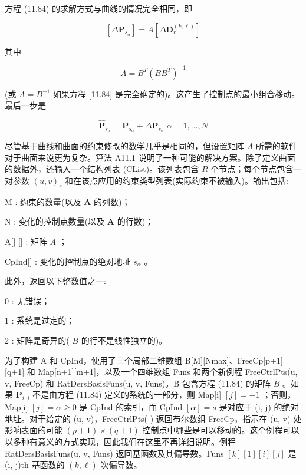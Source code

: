 \documentclass[../main.tex]{subfiles}
\begin{document}
方程 (11.84) 的求解方式与曲线的情况完全相同，即

\[
\left\lbrack  {\Delta {\mathbf{P}}_{{s}_{\alpha }}}\right\rbrack   = A\left\lbrack  {\Delta {\mathbf{D}}_{r}^{\left( k,\ell \right) }}\right\rbrack   \tag{11.85}
\]

其中

\[
A = {B}^{T}{\left( B{B}^{T}\right) }^{-1} \tag{11.86}
\]

(或 \(A = {B}^{-1}\) 如果方程 [11.84] 是完全确定的)。这产生了控制点的最小组合移动。最后一步是

\[
{\widehat{\mathbf{P}}}_{{s}_{\alpha }} = {\mathbf{P}}_{{s}_{\alpha }} + \Delta {\mathbf{P}}_{{s}_{\alpha }}\;\alpha  = 1,\ldots ,N \tag{11.87}
\]

尽管基于曲线和曲面的约束修改的数学几乎是相同的，但设置矩阵 \(A\) 所需的软件对于曲面来说更为复杂。算法 A11.1 说明了一种可能的解决方案。除了定义曲面的数据外，还输入一个结构列表 (CList)。该列表包含 \(R\) 个节点；每个节点包含一对参数 \({\left( u,v\right) }_{r}\) 和在该点应用的约束类型列表(实际约束不被输入)。输出包括:

M : 约束的数量(以及 \(\mathbf{A}\) 的列数)；

N : 变化的控制点数量(以及 \(\mathbf{A}\) 的行数)；

A[] [] : 矩阵 \(A\) ；

CpInd[] : 变化的控制点的绝对地址 \({s}_{\alpha }\) 。

此外，返回以下整数值之一:

0 : 无错误；

1 : 系统是过定的；

2 : 矩阵是奇异的( \(B\) 的行不是线性独立的)。

为了构建 A 和 CpInd，使用了三个局部二维数组 B[M][Nmax]、FreeCp[p+1][q+1] 和 Map[n+1][m+1]，以及一个四维数组 Funs 和两个新例程 FreeCtrlPts(u, v, FreeCp) 和 RatDersBasisFuns(u, v, Funs)。B 包含方程 (11.84) 的矩阵 \(B\) 。如果 \({\mathbf{P}}_{i,j}\) 不是由方程 (11.84) 定义的系统的一部分，则 Map[i] \(\left\lbrack  j\right\rbrack   =  - 1\) ；否则，Map[i] \(\left\lbrack  j\right\rbrack   = \alpha  \geq  0\) 是 CpInd 的索引，而 CpInd \(\left\lbrack  \alpha \right\rbrack   = s\) 是对应于 (i, j) 的绝对地址。对于给定的 (u, v)，FreeCtrlPts(   ) 返回布尔数组 FreeCp，指示在 (u, v) 处影响表面的可能 \(\left( {p + 1}\right)  \times  \left( {q + 1}\right)\) 控制点中哪些是可以移动的。这个例程可以以多种有意义的方式实现，因此我们在这里不再详细说明。例程 RatDersBasisFuns(u, v, Funs) 返回基函数及其偏导数。Funs \(\left\lbrack  k\right\rbrack  \left\lbrack  1\right\rbrack  \left\lbrack  i\right\rbrack  \left\lbrack  j\right\rbrack\) 是 (i, j)th 基函数的 \(\left( {k,\ell }\right)\) 次偏导数。
\end{document}
